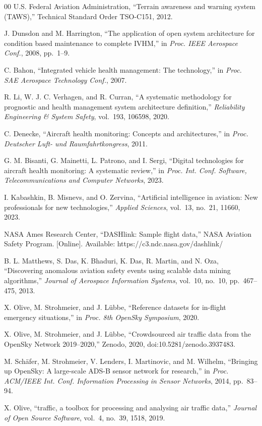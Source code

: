 \documentclass[conference]{IEEEtran}
\begin{document}
\begin{thebibliography}{00}
U.S. Federal Aviation Administration, ``Terrain awareness and warning system
(TAWS),'' Technical Standard Order TSO-C151, 2012.

J. Dunsdon and M. Harrington, ``The application of open system architecture
for condition based maintenance to complete IVHM,'' in \emph{Proc. IEEE
Aerospace Conf.}, 2008, pp.~1--9.

C. Bahon, ``Integrated vehicle health management: The technology,'' in
\emph{Proc. SAE Aerospace Technology Conf.}, 2007.

R. Li, W. J. C. Verhagen, and R. Curran, ``A systematic methodology for
prognostic and health management system architecture definition,''
\emph{Reliability Engineering \& System Safety}, vol.~193, 106598, 2020.

C. Denecke, ``Aircraft health monitoring: Concepts and architectures,'' in
\emph{Proc. Deutscher Luft- und Raumfahrtkongress}, 2011.

G. M. Bisanti, G. Mainetti, L. Patrono, and I. Sergi, ``Digital technologies
for aircraft health monitoring: A systematic review,'' in \emph{Proc. Int.
Conf. Software, Telecommunications and Computer Networks}, 2023.

I. Kabashkin, B. Misnevs, and O. Zervina, ``Artificial intelligence in
aviation: New professionals for new technologies,'' \emph{Applied Sciences},
vol.~13, no.~21, 11660, 2023.

NASA Ames Research Center, ``DASHlink: Sample flight data,'' NASA Aviation
Safety Program. [Online]. Available: https://c3.ndc.nasa.gov/dashlink/

B. L. Matthews, S. Das, K. Bhaduri, K. Das, R. Martin, and N. Oza,
``Discovering anomalous aviation safety events using scalable data mining
algorithms,'' \emph{Journal of Aerospace Information Systems}, vol.~10,
no.~10, pp.~467--475, 2013.

X. Olive, M. Strohmeier, and J. L\"ubbe, ``Reference datasets for in-flight
emergency situations,'' in \emph{Proc. 8th OpenSky Symposium}, 2020.

X. Olive, M. Strohmeier, and J. L\"ubbe, ``Crowdsourced air traffic data from
the OpenSky Network 2019--2020,'' Zenodo, 2020,
doi:10.5281/zenodo.3937483.

M. Sch\"afer, M. Strohmeier, V. Lenders, I. Martinovic, and M. Wilhelm,
``Bringing up OpenSky: A large-scale ADS-B sensor network for research,'' in
\emph{Proc. ACM/IEEE Int. Conf. Information Processing in Sensor Networks},
2014, pp.~83--94.

X. Olive, ``traffic, a toolbox for processing and analysing air traffic
data,'' \emph{Journal of Open Source Software}, vol.~4, no.~39, 1518, 2019.

\end{thebibliography}
\end{document}
